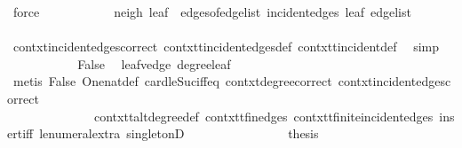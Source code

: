 \begin{isabellebody}
\ force\isanewline
\ \ \ \ \ \ \ \ \isamarkupfalse%
\ \isamarkupfalse%
\ {\isachardoublequoteopen}{\isacharbraceleft}{\kern0pt}{\isacharquery}{\kern0pt}neigh{\isacharcomma}{\kern0pt}\ leaf{\isacharbraceright}{\kern0pt}\ {\isasymin}\ edges{\isacharunderscore}{\kern0pt}of{\isacharunderscore}{\kern0pt}edge{\isacharunderscore}{\kern0pt}list\ {\isacharparenleft}{\kern0pt}incident{\isacharunderscore}{\kern0pt}edges\ leaf\ {\isacharquery}{\kern0pt}edge{\isacharunderscore}{\kern0pt}list{\isacharparenright}{\kern0pt}{\isachardoublequoteclose}\isanewline
\ \ \ \ \ \ \ \ \ \ \isamarkupfalse%
\ contxt{\isachardot}{\kern0pt}incident{\isacharunderscore}{\kern0pt}edges{\isacharunderscore}{\kern0pt}correct\ contxt{\isachardot}{\kern0pt}t{\isachardot}{\kern0pt}incident{\isacharunderscore}{\kern0pt}edges{\isacharunderscore}{\kern0pt}def\ contxt{\isachardot}{\kern0pt}t{\isachardot}{\kern0pt}incident{\isacharunderscore}{\kern0pt}def\ \isamarkupfalse%
\ simp\isanewline
\ \ \ \ \ \ \ \ \isamarkupfalse%
\ \isamarkupfalse%
\ False\ \isamarkupfalse%
\ leaf{\isacharunderscore}{\kern0pt}v{\isacharunderscore}{\kern0pt}edge\ degree{\isacharunderscore}{\kern0pt}leaf\isanewline
\ \ \ \ \ \ \ \ \ \ \isamarkupfalse%
\ {\isacharparenleft}{\kern0pt}metis\ False\ One{\isacharunderscore}{\kern0pt}nat{\isacharunderscore}{\kern0pt}def\ card{\isacharunderscore}{\kern0pt}le{\isacharunderscore}{\kern0pt}Suc{}{\isacharunderscore}{\kern0pt}iff{\isacharunderscore}{\kern0pt}eq\ contxt{\isachardot}{\kern0pt}degree{\isacharunderscore}{\kern0pt}correct\ contxt{\isachardot}{\kern0pt}incident{\isacharunderscore}{\kern0pt}edges{\isacharunderscore}{\kern0pt}correct\isanewline
\ \ \ \ \ \ \ \ \ \ \ \ \ \ contxt{\isachardot}{\kern0pt}t{\isachardot}{\kern0pt}alt{\isacharunderscore}{\kern0pt}degree{\isacharunderscore}{\kern0pt}def\ contxt{\isachardot}{\kern0pt}t{\isachardot}{\kern0pt}fin{\isacharunderscore}{\kern0pt}edges\ contxt{\isachardot}{\kern0pt}t{\isachardot}{\kern0pt}finite{\isacharunderscore}{\kern0pt}incident{\isacharunderscore}{\kern0pt}edges\ insert{\isacharunderscore}{\kern0pt}iff\ le{\isacharunderscore}{\kern0pt}numeral{\isacharunderscore}{\kern0pt}extra{\isacharparenleft}{\kern0pt}{}{\isacharparenright}{\kern0pt}\ singletonD{\isacharparenright}{\kern0pt}\isanewline
\ \ \ \ \ \ \isamarkupfalse%
\isanewline
\ \ \ \ \ \ \isamarkupfalse%
\ \isamarkupfalse%
\ {\isacharquery}{\kern0pt}thesis\ \isamarkupfalse%

\end{isabellebody}
